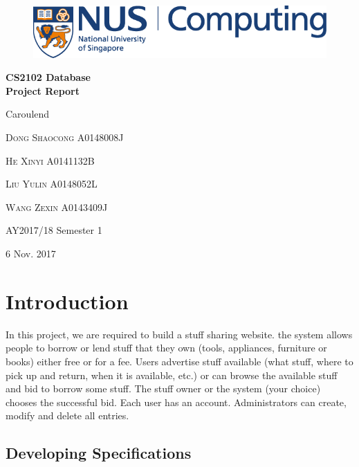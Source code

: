 \begin{titlepage}
\begin{figure}[h]
      \centering
	\includegraphics[scale=0.6]{logo.png}
\end{figure}
	\centering
	\vspace*{.09\textheight}
	{\LARGE\bfseries CS2102 Database\\
Project Report\par}
	\vspace{1.5cm}
	{\huge Caroulend\par}
	\vspace{1cm}
	{\scshape\Large Dong Shaocong A0148008J\par}
	{\scshape\Large He Xinyi A0141132B\par}
	{\scshape\Large Liu Yulin A0148052L\par}
	{\scshape\Large Wang Zexin A0143409J\par}
	\vspace{3cm}
	
	\vspace{3cm}

	{AY2017/18 Semester 1\par}
	{6 Nov. 2017\par}
\end{titlepage}

\tableofcontents
\newpage

\section{Introduction}
In this project, we are required to build a stuff sharing website. the system allows people to borrow or lend stuff that they own (tools, appliances, furniture or books) either free or for a fee. Users advertise stuff available (what stuff, where to pick up and return, when it is available, etc.) or can browse the available stuff and bid to borrow some stuff. The stuff owner or the system (your choice) chooses the successful bid. Each user has an account. Administrators can create, modify and delete all entries.
\subsection{Developing Specifications}

